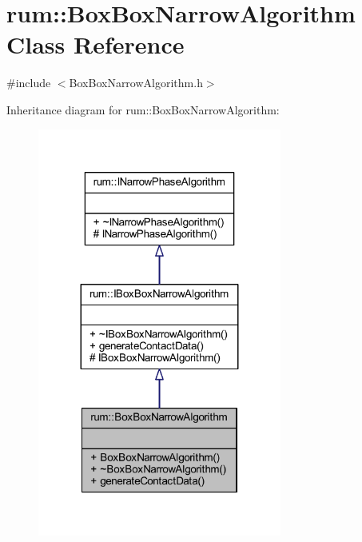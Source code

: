\hypertarget{classrum_1_1_box_box_narrow_algorithm}{}\section{rum\+:\+:Box\+Box\+Narrow\+Algorithm Class Reference}
\label{classrum_1_1_box_box_narrow_algorithm}


{\ttfamily \#include $<$Box\+Box\+Narrow\+Algorithm.\+h$>$}



Inheritance diagram for rum\+:\+:Box\+Box\+Narrow\+Algorithm\+:\nopagebreak
\begin{figure}[H]
\begin{center}
\leavevmode
\includegraphics[width=227pt]{classrum_1_1_box_box_narrow_algorithm__inherit__graph}
\end{center}
\end{figure}


